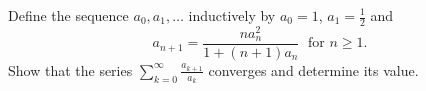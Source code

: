 \documentclass{article}
\begin{document}
\setlength{\parindent}{0pt}
Define the sequence $a_{0},a_{1},\dots$ inductively by $a_{0}=1$, $a_{1}=\frac{1}{2}$ and$$a_{n+1}=\frac{na_{n}^{2}}{1+(n+1)a_{n}}\;\text{ for }n\ge1.$$Show that the series $\sum_{k=0}^{\infty}\frac{a_{k+1}}{a_{k}}$ converges and determine its value.
\end{document}
